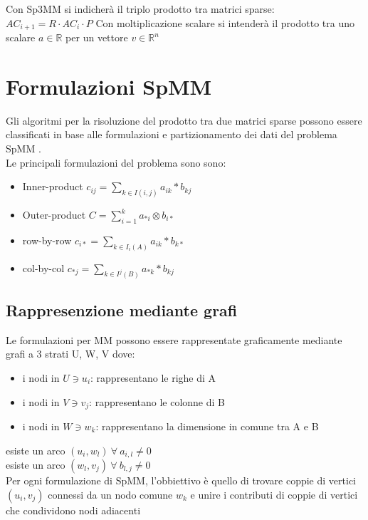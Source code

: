 \label{notazioneNaming}
Con Sp3MM si indicherà il triplo prodotto tra matrici sparse: $AC_{i+1}=R \cdot AC_i \cdot P$
Con moltiplicazione scalare si intenderà il prodotto tra uno scalare $a \in \mathbb{R}$ per un vettore $v \in \mathbb{R}^n$\\

\section{Formulazioni SpMM}	\label{ChExistingTecqs:formulazioni}
Gli algoritmi per la risoluzione del prodotto tra due matrici sparse possono
essere classificati in base alle formulazioni e partizionamento dei dati del problema SpMM 
\cite{sysReviewChi}.\\ Le principali formulazioni del problema sono sono:
\begin{itemize}
  \item Inner-product \qquad $c_{ij} = \sum\limits_{k \in I(i,j)}  a_{ik} \ast  b_{kj}$
  \item Outer-product \qquad $C = \sum\limits_{i=1}^k  a_{*i} \otimes  b_{i*}$		
  \item row-by-row	  \qquad $c_{i*} = \sum\limits_{k \in I_i(A)}  a_{ik} \ast  b_{k*}$
  \item col-by-col    \qquad $c_{*j} = \sum\limits_{k \in I^j(B)}  a_{*k} \ast  b_{kj}$
\end{itemize}

\subsection{Rappresenzione mediante grafi}
Le formulazioni per MM possono essere rappresentate graficamente mediante
grafi a 3 strati U, W, V \cite{2dNewIdeas,cohen3LayeredGraphs} dove:
\begin{itemize}
  \item i nodi in $U \ni u_i$:   rappresentano le righe di A
  \item i nodi in $V \ni v_j$:   rappresentano le colonne di B
  \item i nodi in $W \ni w_k$:   rappresentano la dimensione in comune tra A e B
\end{itemize}
esiste un arco $(u_i,w_l) ~ \forall ~ a_{i,l} \neq 0$\\
esiste un arco $(w_l,v_j) ~ \forall ~ b_{l,j} \neq 0$\\
Per ogni formulazione di SpMM, l'obbiettivo è quello di trovare coppie di
vertici $(u_i,v_j)$ connessi da un nodo comune $w_k$ e unire i
contributi di coppie di vertici che condividono nodi adiacenti\\ %

